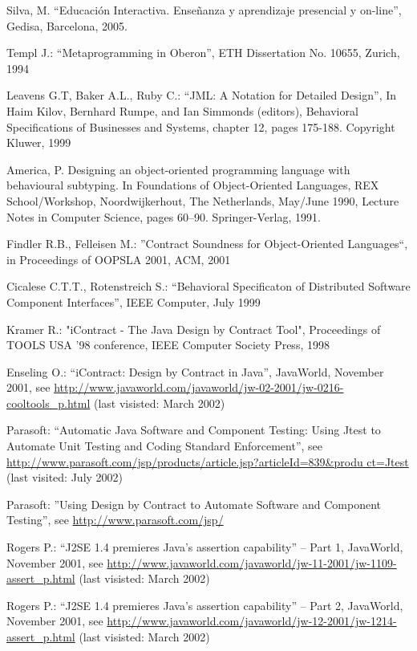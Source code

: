 \begin{thebibliography}{1}
{
Silva, M. “Educación Interactiva. Enseñanza y aprendizaje presencial y
on-line”, Gedisa, Barcelona, 2005.


Templ J.: “Metaprogramming in Oberon”, ETH Dissertation No.
10655, Zurich, 1994


 Leavens G.T, Baker A.L., Ruby C.: “JML: A Notation for
Detailed Design”, In Haim Kilov, Bernhard Rumpe, and Ian Simmonds
(editors), Behavioral Specifications of Businesses and Systems,
chapter 12, pages 175-188. Copyright Kluwer, 1999

America, P. Designing an object-oriented programming
language with behavioural subtyping. In Foundations of
Object-Oriented Languages, REX School/Workshop,
Noordwijkerhout, The Netherlands, May/June 1990, Lecture
Notes in Computer Science, pages 60–90. Springer-Verlag,
1991.

Findler R.B., Felleisen M.: ''Contract Soundness for Object-Oriented
Languages``, in Proceedings of OOPSLA 2001, ACM, 2001

Cicalese C.T.T., Rotenstreich S.: “Behavioral Specificaton of
Distributed Software Component Interfaces”, IEEE Computer, July
1999


Kramer R.: "iContract - The Java Design by Contract Tool",
Proceedings of TOOLS USA '98 conference, IEEE Computer Society
Press, 1998


 Enseling O.: “iContract: Design by Contract in
Java”, JavaWorld, November 2001, see
\url{http://www.javaworld.com/javaworld/jw-02-2001/jw-0216-cooltools_p.html}
(last visisted: March 2002)

Parasoft: “Automatic Java Software and Component Testing: Using
Jtest to Automate Unit Testing and Coding Standard Enforcement”,
see
\url{http://www.parasoft.com/jsp/products/article.jsp?articleId=839&produ
ct=Jtest} (last visited: July 2002)


Parasoft: ''Using Design by Contract to Automate Software and
Component Testing'', see
\url{http://www.parasoft.com/jsp/}

Rogers P.: “J2SE 1.4 premieres Java’s assertion capability”
– Part 1, JavaWorld, November 2001, see
\url{http://www.javaworld.com/javaworld/jw-11-2001/jw-1109-
assert_p.html} (last visisted: March 2002)

 Rogers P.: “J2SE 1.4 premieres Java’s assertion capability”
– Part 2, JavaWorld, November 2001,
see \url{http://www.javaworld.com/javaworld/jw-12-2001/jw-1214-
assert_p.html} (last visisted: March 2002)

}
\end{thebibliography}
